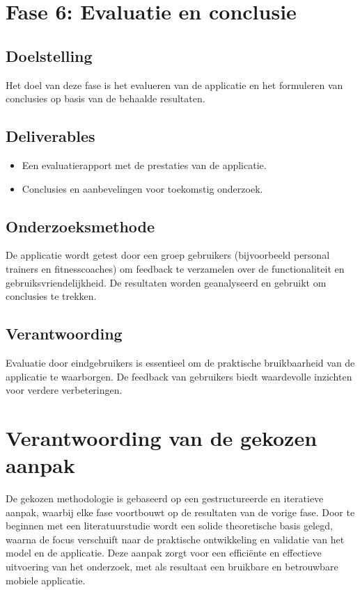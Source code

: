 \section{Fase 6: Evaluatie en conclusie}
\subsection{Doelstelling}
Het doel van deze fase is het evalueren van de applicatie en het formuleren van conclusies op basis van de behaalde resultaten.  

\subsection{Deliverables}
\begin{itemize}
    \item Een evaluatierapport met de prestaties van de applicatie.
    \item Conclusies en aanbevelingen voor toekomstig onderzoek.
\end{itemize}

\subsection{Onderzoeksmethode}
De applicatie wordt getest door een groep gebruikers (bijvoorbeeld personal trainers en fitnesscoaches) om feedback te verzamelen over de functionaliteit en gebruiksvriendelijkheid. De resultaten worden geanalyseerd en gebruikt om conclusies te trekken.  

\subsection{Verantwoording}
Evaluatie door eindgebruikers is essentieel om de praktische bruikbaarheid van de applicatie te waarborgen. De feedback van gebruikers biedt waardevolle inzichten voor verdere verbeteringen.  

\section{Verantwoording van de gekozen aanpak}
De gekozen methodologie is gebaseerd op een gestructureerde en iteratieve aanpak, waarbij elke fase voortbouwt op de resultaten van de vorige fase. Door te beginnen met een literatuurstudie wordt een solide theoretische basis gelegd, waarna de focus verschuift naar de praktische ontwikkeling en validatie van het model en de applicatie. Deze aanpak zorgt voor een efficiënte en effectieve uitvoering van het onderzoek, met als resultaat een bruikbare en betrouwbare mobiele applicatie.


